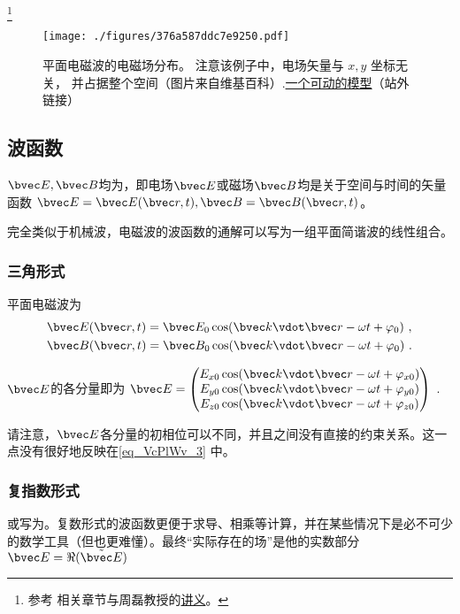 

\footnote{参考 \cite{GriffE} 相关章节与周磊教授的\href{http://fdjpkc.fudan.edu.cn/d200927/2009/0314/c8569a14801/page.htm}{讲义}。}

\begin{figure}[ht]
\centering
\texttt{[image: ./figures/376a587ddc7e9250.pdf]}
\caption{平面电磁波的电磁场分布。 注意该例子中，电场矢量与 $x, y$ 坐标无关， 并占据整个空间（图片来自维基百科）.\href{https://www.geogebra.org/m/xhYwXSsH}{一个可动的模型}（站外链接）} \label{fig_VcPlWv_1}
\end{figure}

\subsection{波函数}
$\bvec E, \bvec B$均为，即电场$\bvec E$或磁场$\bvec B$均是关于空间与时间的矢量函数 $\bvec E = \bvec E(\bvec r, t), \bvec B = \bvec B(\bvec r, t)$。

完全类似于机械波，电磁波的波函数的通解可以写为一组平面简谐波的线性组合。

\subsubsection{三角形式}
平面电磁波为
\begin{align}\label{eq_VcPlWv_3}
&\bvec E(\bvec r, t) = \bvec E_0 \cos(\bvec k\vdot \bvec r - \omega t + \varphi_0)~,\\
&\bvec B(\bvec r, t) = \bvec B_0 \cos(\bvec k \vdot \bvec r - \omega t + \varphi_0)~.
\end{align}

$\bvec E$的各分量即为
$\bvec E = 
\begin{pmatrix}
E_{x0} \cos(\bvec k\vdot \bvec r - \omega t+ \varphi_{x0})\\
E_{y0} \cos(\bvec k\vdot \bvec r - \omega t+ \varphi_{y0})\\
E_{z0} \cos(\bvec k\vdot \bvec r - \omega t+ \varphi_{z0})\\
\end{pmatrix}~.
$

请注意，$\bvec E$各分量的初相位可以不同，并且之间没有直接的约束关系。这一点没有很好地反映在\autoref{eq_VcPlWv_3} 中。

\subsubsection{复指数形式}
或写为。复数形式的波函数更便于求导、相乘等计算，并在某些情况下是必不可少的数学工具（但也更难懂）。最终“实际存在的场”是他的实数部分 $\bvec E = \Re (\tilde {\bvec E})$

